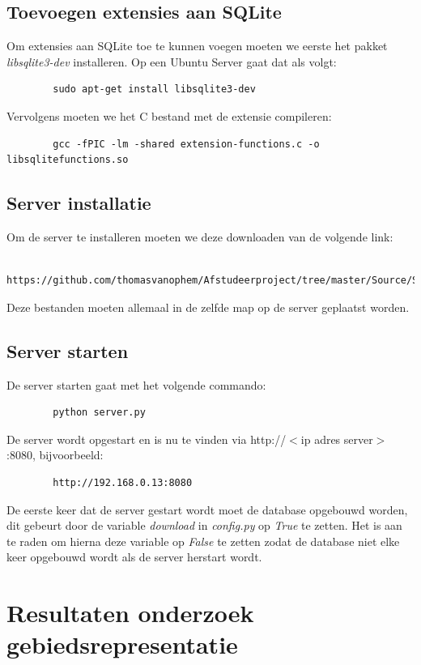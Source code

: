 \documentclass[twoside,openright]{uva-bachelor-thesis}
\begin{document}
	\section{Toevoegen extensies aan SQLite}
		Om extensies aan SQLite toe te kunnen voegen moeten we eerste het pakket \textit{libsqlite3-dev} installeren. Op een Ubuntu Server gaat dat als volgt:
		\begin{verbatim}
		sudo apt-get install libsqlite3-dev
		\end{verbatim}
		Vervolgens moeten we het C bestand met de extensie compileren:
		\begin{verbatim}
		gcc -fPIC -lm -shared extension-functions.c -o libsqlitefunctions.so
		\end{verbatim}
	\section{Server installatie}
		Om de server te installeren moeten we deze downloaden van de volgende link:
		\begin{verbatim}
		https://github.com/thomasvanophem/Afstudeerproject/tree/master/Source/Server
		\end{verbatim}
		Deze bestanden moeten allemaal in de zelfde map op de server geplaatst worden.
	\section{Server starten}
		De server starten gaat met het volgende commando:
		\begin{verbatim}
		python server.py
		\end{verbatim}
		De server wordt opgestart en is nu te vinden via http://$<$ip adres server$>$:8080, bijvoorbeeld:
		\begin{verbatim}
		http://192.168.0.13:8080
		\end{verbatim}
		De eerste keer dat de server gestart wordt moet de database opgebouwd worden, dit gebeurt door de variable \textit{download} in \textit{config.py} op \textit{True} te zetten. Het is aan te raden om hierna deze variable op \textit{False} te zetten zodat de database niet elke keer opgebouwd wordt als de server herstart wordt.
\chapter{Resultaten onderzoek gebiedsrepresentatie}
\label{app:results_rep}
\end{document}
